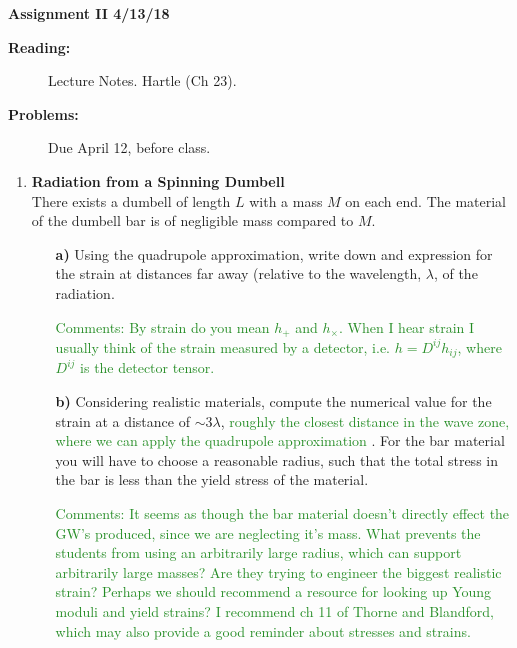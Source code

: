 \documentclass[11pt]{article}
\newcommand{\zach}[1]{\textcolor{ForestGreen}{#1}}
\begin{document}
%
\centerline{\large\bf  \hfill Assignment II \hfill  4/13/18}

\medskip
\begin{description}
\item[{\bf Reading:}] Lecture Notes. Hartle (Ch 23). \\
\item[{\bf Problems:} \hfill ] Due April 12, before class.
\end{description}


\medskip

\begin{enumerate}

\item
{\bf Radiation from a Spinning Dumbell} \\
There exists a dumbell of length $L$ with a mass $M$ on each end. The
material of the dumbell bar is of negligible mass compared to $M$.
\begin{itemize}

\item[\bf a)] Using the quadrupole approximation, write down and
  expression for the strain at distances far away (relative to the
  wavelength, $\lambda$, of the radiation.
  
  \zach{Comments: By strain do you mean $h_+$ and $h_\times$. When I hear strain I usually think of the strain measured by a detector, i.e. $h=D^{ij}h_{ij}$, where $D^{ij}$ is the detector tensor.}

\item[\bf b)] Considering realistic materials, compute the numerical
  value for the strain at a distance of $\sim 3 \lambda$, \zach{roughly the closest distance in the wave zone, where we can apply the quadrupole approximation} . For the bar
  material you will have to choose a reasonable radius, such that the
  total stress in the bar is less than the yield stress of the
  material. 
  
  \zach{Comments: It seems as though the bar material doesn't directly effect the GW's produced, since we are neglecting it's mass. What prevents the students from using an arbitrarily large radius, which can support arbitrarily large masses? Are they trying to engineer the biggest realistic strain? Perhaps we should recommend a resource for looking up Young moduli and yield strains? I recommend ch 11 of Thorne and Blandford, which may also provide a good reminder about stresses and strains.}

\end{itemize}


\end{enumerate}
\end{document}
